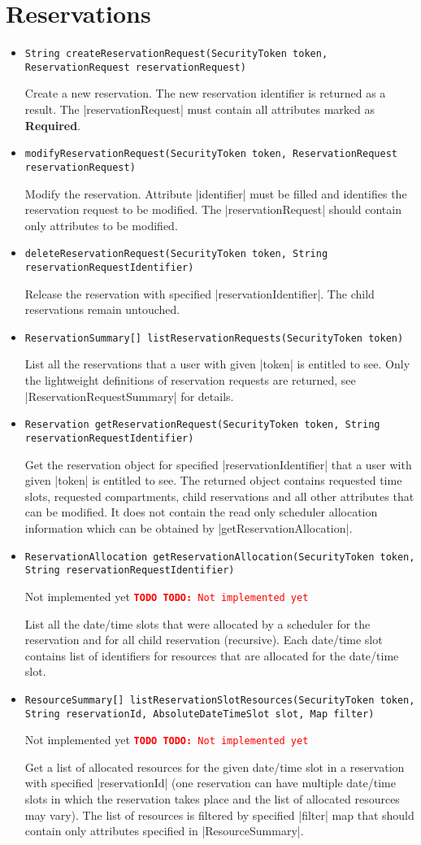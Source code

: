 \documentclass[a4paper]{report}
\newenvironment{Api}{\begin{itemize}}{\end{itemize}}
\newcommand{\ApiCode}[1]{\lstinline[style=styleApi]|#1|}
\newcommand{\ApiItem}[1]{\item #1 %

}
\newcommand{\ApiCmd}[1]{\ApiItem{\ApiCode{#1}}}
\newcommand{\ApiRequired}{{\color{blue!50!black}\textbf{Required}}}
\newcommand{\TODO}[1]{%
\def\empty{}%
\def\prvniparametr{#1}%
\ifx\prvniparametr\empty%
\begingroup\tt\textcolor{red}{\noindent\textbf{TODO}}\endgroup
\else%
\begingroup\tt\textcolor{red}{\noindent\textbf{TODO:}\ #1}\endgroup
\fi%
}
\begin{document}
\section{Reservations}

\begin{Api}

\ApiCmd{String createReservationRequest(SecurityToken token, ReservationRequest reservationRequest)}
Create a new reservation. The new reservation identifier is returned as a result. The |reservationRequest| must contain all attributes marked as \ApiRequired.

\ApiCmd{modifyReservationRequest(SecurityToken token, ReservationRequest reservationRequest)}
Modify the reservation. Attribute |identifier| must be filled and identifies the reservation request to be modified. The |reservationRequest| should contain only attributes to be modified.

\ApiCmd{deleteReservationRequest(SecurityToken token, String reservationRequestIdentifier)}
Release the reservation with specified |reservationIdentifier|. The child reservations remain untouched.

\ApiCmd{ReservationSummary[] listReservationRequests(SecurityToken token)}
List all the reservations that a user with given |token| is entitled to see. Only the lightweight definitions of reservation requests are returned, see |ReservationRequestSummary| for details.

\ApiCmd{Reservation getReservationRequest(SecurityToken token, String reservationRequestIdentifier)}
Get the reservation object for specified |reservationIdentifier| that a user with given |token| is entitled to see. The returned object contains requested time slots, requested compartments, child reservations and all other attributes that can be modified. It does not contain the read only scheduler allocation information which can be obtained by |getReservationAllocation|.

\ApiCmd{ReservationAllocation getReservationAllocation(SecurityToken token, String reservationRequestIdentifier)}
\TODO{Not implemented yet}
List all the date/time slots that were allocated by a scheduler for the reservation and for all child reservation (recursive). Each date/time slot contains list of identifiers for resources that are allocated for the date/time slot.

\ApiCmd{ResourceSummary[] listReservationSlotResources(SecurityToken token, String reservationId, AbsoluteDateTimeSlot slot, Map filter)}
\TODO{Not implemented yet}
Get a list of allocated resources for the given date/time slot in a reservation with specified |reservationId| (one reservation can have multiple date/time slots in which the reservation takes place and the list of allocated resources may vary). The list of resources is filtered by specified |filter| map that should contain only attributes specified in |ResourceSummary|.


\end{Api}
\end{document}
